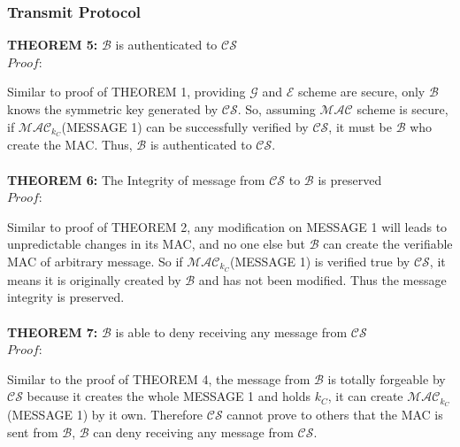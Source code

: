 \subsubsection*{Transmit Protocol}
\textbf{THEOREM 5:} $\mathcal{B}$ is authenticated to $\mathcal{CS}$ \\
\emph{$Proof:$} \par
Similar to proof of THEOREM 1, providing $\mathcal{G}$ and $\mathcal{E}$ scheme are secure, only $\mathcal{B}$ knows the symmetric key generated by $\mathcal{CS}$. So, assuming $\mathcal{MAC}$ scheme is secure, if $\mathcal{MAC}_{k_C}$(MESSAGE 1) can be successfully verified by $\mathcal{CS}$, it must be $\mathcal{B}$ who create the MAC. Thus, $\mathcal{B}$ is authenticated to $\mathcal{CS}$.
\\
\\
\textbf{THEOREM 6:} The Integrity of message from $\mathcal{CS}$ to $\mathcal{B}$ is preserved \\
\emph{$Proof:$} \par
Similar to proof of THEOREM 2, any modification on MESSAGE 1 will leads to unpredictable changes in its MAC, and no one else but $\mathcal{B}$ can create the verifiable MAC of arbitrary message. So if $\mathcal{MAC}_{k_C}$(MESSAGE 1) is verified true by $\mathcal{CS}$, it means it is originally created by $\mathcal{B}$ and has not been modified. Thus the message integrity is preserved.
\\
\\
\textbf{THEOREM 7:} $\mathcal{B}$ is able to deny receiving any message from $\mathcal{CS}$ \\
\emph{$Proof:$} \par
Similar to the proof of THEOREM 4, the message from $\mathcal{B}$ is totally forgeable by $\mathcal{CS}$ because it creates the whole MESSAGE 1 and holds $k_C$, it can create $\mathcal{MAC}_{k_C}$(MESSAGE 1) by it own. Therefore $\mathcal{CS}$ cannot prove to others that the MAC is sent from $\mathcal{B}$, $\mathcal{B}$ can deny receiving any message from $\mathcal{CS}$.

